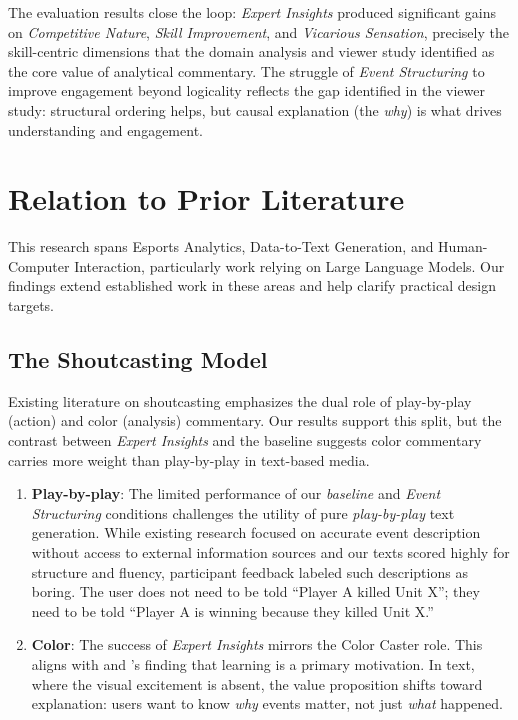 The evaluation results close the loop: \textit{Expert Insights} produced significant gains on \textit{Competitive Nature}, \textit{Skill Improvement}, and \textit{Vicarious Sensation}, precisely the skill-centric dimensions that the domain analysis and viewer study identified as the core value of analytical commentary. The struggle of \textit{Event Structuring} to improve engagement beyond logicality reflects the gap identified in the viewer study: structural ordering helps, but causal explanation (the \textit{why}) is what drives understanding and engagement.

\section{Relation to Prior Literature}

This research spans Esports Analytics, Data-to-Text Generation, and Human-Computer Interaction, particularly work relying on Large Language Models. Our findings extend established work in these areas and help clarify practical design targets.

\subsection{The Shoutcasting Model}
Existing literature on shoutcasting \cite{li2020, kempecook2019} emphasizes the dual role of play-by-play (action) and color (analysis) commentary. Our results support this split, but the contrast between \textit{Expert Insights} and the baseline suggests color commentary carries more weight than play-by-play in text-based media.
\begin{enumerate}[noitemsep,topsep=0pt]
  \item \textbf{Play-by-play}: The limited performance of our \textit{baseline} and \textit{Event Structuring} conditions challenges the utility of pure \textit{play-by-play} text generation. While existing research \cite{taniguchi2019, wang2021} focused on accurate event description without access to external information sources and our texts scored highly for structure and fluency, participant feedback labeled such descriptions as boring. The user does not need to be told ``Player A killed Unit X''; they need to be told ``Player A is winning because they killed Unit X.''
  \item \textbf{Color}: The success of \textit{Expert Insights} mirrors the Color Caster role. This aligns with \citet{sjoblom2017} and \citet{hamari2017}'s finding that learning is a primary motivation. In text, where the visual excitement is absent, the value proposition shifts toward explanation: users want to know \textit{why} events matter, not just \textit{what} happened.
\end{enumerate}

